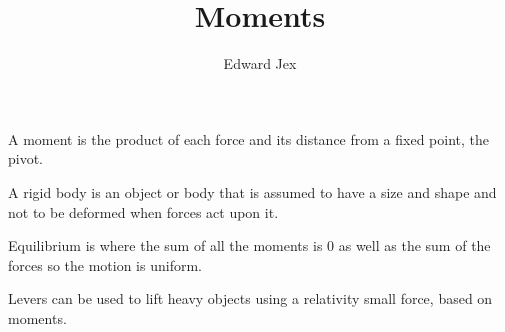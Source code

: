\documentclass[a4paper,12pt]{article}
\begin{document}
\title{Moments}	
\author{Edward Jex}
\maketitle
A moment is the product of each force and its distance from a fixed point, the pivot.

A rigid body is an object or body that is assumed to have a size and shape and not to be deformed when forces act upon it. 

Equilibrium is where the sum of all the moments is 0 as well as the sum of the forces so the motion is uniform. 

Levers can be used to lift heavy objects using a relativity small force, based on moments. 
\end{document}
